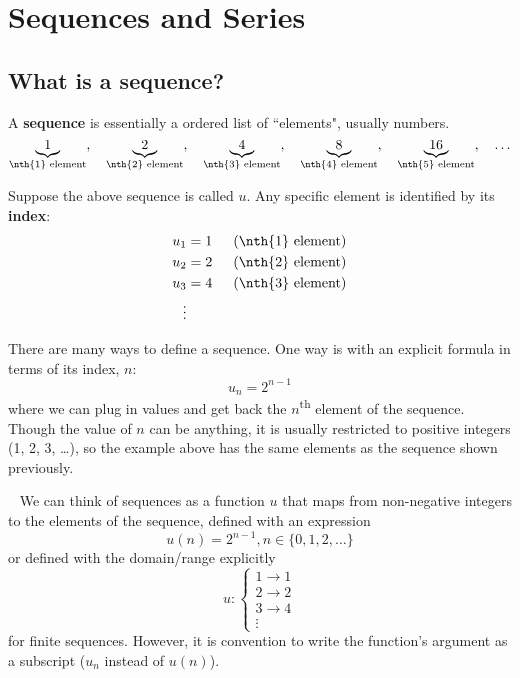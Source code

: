 \documentclass[../../main.tex]{subfiles}
\begin{document}
\chapter{Sequences and Series}

\newpage
\section{What is a sequence?}

A \textbf{sequence} is essentially a ordered list of ``elements", usually numbers.
\[
    \underbrace{1}_\text{\nth{1} element},\quad
    \underbrace{2}_\text{\nth{2} element},\quad
    \underbrace{4}_\text{\nth{3} element},\quad
    \underbrace{8}_\text{\nth{4} element},\quad
    \underbrace{16}_\text{\nth{5} element},\quad
    \ldots
\]

\noindent Suppose the above sequence is called \(u\). Any specific element is identified by its \textbf{index}:
\begin{align}
    u_1 &= 1 \indent (\text{\nth{1} element})\\
    u_2 &= 2 \indent (\text{\nth{2} element})\\
    u_3 &= 4 \indent (\text{\nth{3} element})\\
    \vdots
\end{align}

There are many ways to define a sequence. One way is with an explicit formula in terms of its index, \(n\):
\[
    u_n = 2^{n-1}
\]
where we can plug in values and get back the \(n\)\textsuperscript{th} element of the sequence. Though the value of \(n\) can be anything, it is usually restricted to positive integers (1, 2, 3, \ldots), so the example above has the same elements as the sequence shown previously.

\begin{insight}{~}
We can think of sequences as a function \(u\) that maps from non-negative integers to the elements of the sequence, defined with an expression
\[
    u(n) = 2^{n-1}, n\in\{0, 1, 2, \ldots\}
\]
or defined with the domain/range explicitly
\[
    u: \begin{cases}
    1\to1\\
    2\to2\\
    3\to4\\
    \vdots
    \end{cases}
\]
for finite sequences. However, it is convention to write the function's argument as a subscript ($ u_n$ instead of $u(n)$).
\end{insight}
\end{document}

